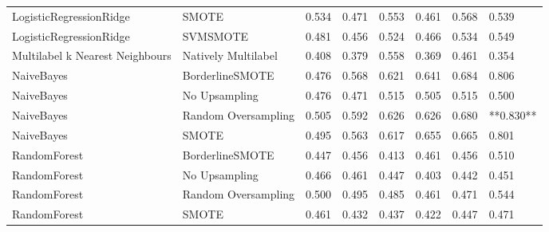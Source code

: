 \begin{tabular}{llllllll}
        LogisticRegressionRidge &                         SMOTE & 0.534 &                     0.471 &                 0.553 &                  0.461 &                                   0.568 &     0.539 \\
        LogisticRegressionRidge &                      SVMSMOTE & 0.481 &                     0.456 &                 0.524 &                  0.466 &                                   0.534 &     0.549 \\
Multilabel k Nearest Neighbours &           Natively Multilabel & 0.408 &                     0.379 &                 0.558 &                  0.369 &                                   0.461 &     0.354 \\
                     NaiveBayes &               BorderlineSMOTE & 0.476 &                     0.568 &                 0.621 &                  0.641 &                                   0.684 &     0.806 \\
                     NaiveBayes &                 No Upsampling & 0.476 &                     0.471 &                 0.515 &                  0.505 &                                   0.515 &     0.500 \\
                     NaiveBayes &           Random Oversampling & 0.505 &                     0.592 &                 0.626 &                  0.626 &                                   0.680 & **0.830** \\
                     NaiveBayes &                         SMOTE & 0.495 &                     0.563 &                 0.617 &                  0.655 &                                   0.665 &     0.801 \\
                   RandomForest &               BorderlineSMOTE & 0.447 &                     0.456 &                 0.413 &                  0.461 &                                   0.456 &     0.510 \\
                   RandomForest &                 No Upsampling & 0.466 &                     0.461 &                 0.447 &                  0.403 &                                   0.442 &     0.451 \\
                   RandomForest &           Random Oversampling & 0.500 &                     0.495 &                 0.485 &                  0.461 &                                   0.471 &     0.544 \\
                   RandomForest &                         SMOTE & 0.461 &                     0.432 &                 0.437 &                  0.422 &                                   0.447 &     0.471 \\

\end{tabular}

